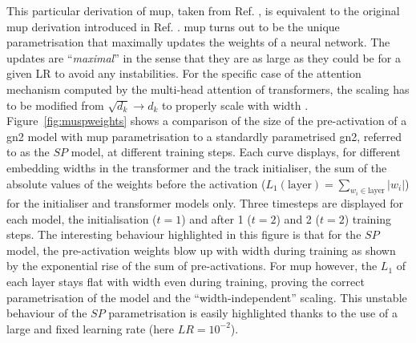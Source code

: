 This particular derivation of \gls{mup}, taken from Ref. \cite{yang2021tuning}, is equivalent to the original \gls{mup} derivation introduced in Ref. \cite{pmlr-v139-yang21c}. \gls{mup} turns out to be the unique parametrisation that maximally updates the weights of a neural network. The updates are ``\textit{maximal}'' in the sense that they are as large as they could be for a given LR to avoid any instabilities. For the specific case of the attention mechanism computed by the multi-head attention of transformers, the scaling has to be modified from $\sqrt{d_k} \rightarrow d_k$ to properly scale with width \cite{yang2021tuning}. Figure~\ref{fig:muspweights} shows a comparison of the size of the pre-activation of a \gls{gn2} model with \gls{mup} parametrisation to a standardly parametrised \gls{gn2}, referred to as the $SP$ model, at different training steps. Each curve displays, for different embedding widths in the transformer and the track initialiser, the sum of the absolute values of the weights before the activation ($L_1(\textrm{layer}) = \sum_{w_i \in \textrm{layer}} |w_i|$) for the initialiser and transformer models only. Three timesteps are displayed for each model, the initialisation ($t=1$) and after 1 ($t=2$) and 2 ($t=2$) training steps. The interesting behaviour highlighted in this figure is that for the $SP$ model, the pre-activation weights blow up with width during training as shown by the exponential rise of the sum of pre-activations. For \gls{mup} however, the $L_1$ of each layer stays flat with width even during training, proving the correct parametrisation of the model and the ``width-independent'' scaling. This unstable behaviour of the $SP$ parametrisation is easily highlighted thanks to the use of a large and fixed learning rate (here $LR = 10^{-2}$). 

